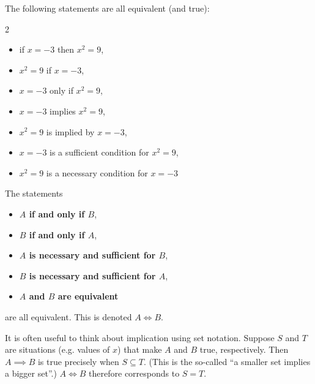 \documentclass{article}
\begin{document}
\begin{example}
    The following statements are all equivalent (and true):
    \begin{multicols}{2}
        \begin{itemize}
            \item if \(x = -3\) then \(x^2 = 9\),
            \item \(x^2 = 9\) if \(x = -3\),
            \item \(x = -3\) only if \(x^2 = 9\),
            \item \(x = -3\) implies \(x^2 = 9\),
            \item \(x^2 = 9\) is implied by \(x = -3\),
            \item \(x = -3\) is a sufficient condition for \(x^2 = 9\),
            \item \(x^2 = 9\) is a necessary condition for \(x = -3\)
        \end{itemize}
    \end{multicols}
\end{example}

The statements
\begin{itemize}
    \item \textbf{\(A\) if and only if \(B\)},
    \item \textbf{\(B\) if and only if \(A\)},
    \item \textbf{\(A\) is necessary and sufficient for \(B\)},
    \item \textbf{\(B\) is necessary and sufficient for \(A\)},
    \item \textbf{\(A\) and \(B\) are equivalent}
\end{itemize}
are all equivalent. This is denoted \(A \iff B\).

It is often useful to think about implication using set notation. Suppose \(S\) and \(T\) are situations (e.g. values of \(x\)) that make \(A\) and \(B\) true, respectively. Then \(A \implies B\) is true precisely when \(S \subseteq T\). (This is the so-called ``a smaller set implies a bigger set''.) \(A \iff B\) therefore corresponds to \(S = T\).
\end{document}
